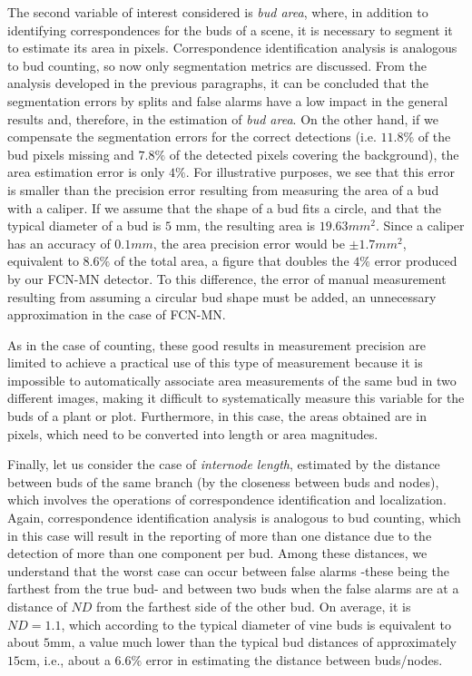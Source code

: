 \documentclass[a4paper,authoryear,review]{elsarticle}
\begin{document}
The second variable of interest considered is \emph{bud area}, where, in addition to identifying correspondences for the buds of a scene, it is necessary to segment it to estimate its area in pixels. Correspondence identification analysis is analogous to bud counting, so now only segmentation metrics are discussed. From the analysis developed in the previous paragraphs, it can be concluded that the segmentation errors by splits and false alarms have a low impact in the general results and, therefore, in the estimation of \emph{bud area}. On the other hand, if we compensate the segmentation errors for the correct detections (i.e. $11.8\%$ of the bud pixels missing and $7.8\%$ of the detected pixels covering the background), the area estimation error is only $4\%$. For illustrative purposes, we see that this error is smaller than the precision error resulting from measuring the area of a bud with a caliper. If we assume that the shape of a bud fits a circle, and that the typical diameter of a bud is $5$ mm, the resulting area is $19.63 mm^2$. Since a caliper has an accuracy of $0.1 mm$, the area precision error would be $\pm 1.7 mm^2$, equivalent to $8.6\%$ of the total area, a figure that doubles the $4\%$ error produced by our FCN-MN detector. To this difference,  the error of manual measurement resulting from assuming a circular bud shape must be added, an unnecessary approximation in the case of FCN-MN.

As in the case of counting, these good results in measurement precision are limited to achieve a practical use of this type of measurement because it is impossible to automatically associate area measurements of the same bud in two different images, making it difficult to systematically measure this variable for the buds of a plant or plot. Furthermore, in this case, the areas obtained are in pixels, which need to be converted into length or area magnitudes.

Finally, let us consider the case of \emph{internode length}, estimated by the distance between buds of the same branch (by the closeness between buds and nodes), which involves the operations of correspondence identification and localization. Again, correspondence identification analysis is analogous to bud counting, which in this case will result in the reporting of more than one distance due to the detection of more than one component per bud. Among these distances, we understand that the worst case can occur between false alarms -these being the farthest from the true bud- and between two buds when the false alarms are at a distance of $ND$ from the farthest side of the other bud. On average, it is $ND = 1.1$, which according to the typical diameter of vine buds is equivalent to about $5$mm, a value much lower than the typical bud distances of approximately $15$cm, i.e., about a $6.6\%$ error in estimating the distance between buds/nodes. 
\end{document}
